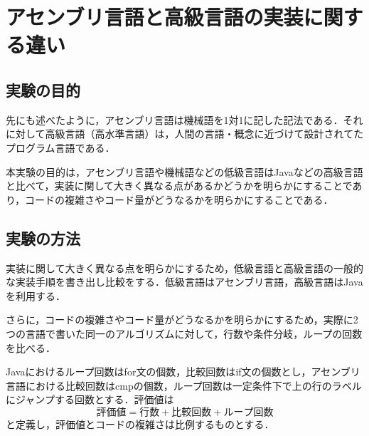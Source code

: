\chapter{アセンブリ言語と高級言語の実装に関する違い}
\section{実験の目的}
先にも述べたように，アセンブリ言語は機械語を1対1に記した記法である．それに対して高級言語（高水準言語）は，人間の言語・概念に近づけて設計されてたプログラム言語である．\cite{高水準言語}\par
本実験の目的は，アセンブリ言語や機械語などの低級言語は{\ttfamily Java}などの高級言語と比べて，実装に関して大きく異なる点があるかどうかを明らかにすることであり，コードの複雑さやコード量がどうなるかを明らかにすることである．
\section{実験の方法}
実装に関して大きく異なる点を明らかにするため，低級言語と高級言語の一般的な実装手順を書き出し比較をする．低級言語はアセンブリ言語，高級言語は{\ttfamily Java}を利用する．\par
さらに，コードの複雑さやコード量がどうなるかを明らかにするため，実際に2つの言語で書いた同一のアルゴリズムに対して，行数や条件分岐，ループの回数を比べる．\par
{\ttfamily Java}におけるループ回数は{\ttfamily for}文の個数，比較回数は{\ttfamily if}文の個数とし，アセンブリ言語における比較回数は{\ttfamily cmp}の個数，ループ回数は一定条件下で上の行のラベルにジャンプする回数とする．評価値は
\[評価値=行数+比較回数+ループ回数\]と定義し，評価値とコードの複雑さは比例するものとする．
